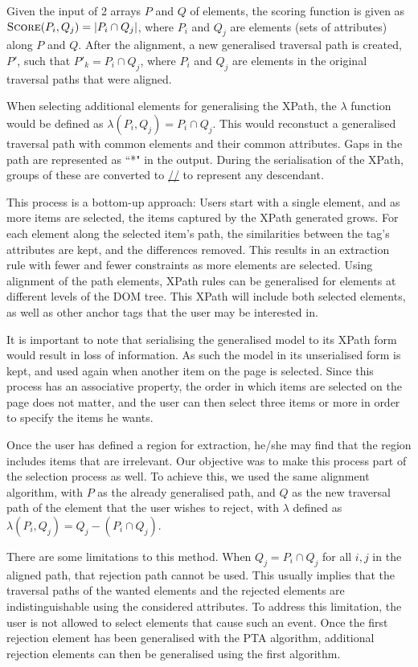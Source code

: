 Given the input of 2 arrays $P$ and $Q$ of elements, the scoring function is given as
$\textsc{Score}(P_i,Q_j) = |P_i \cap Q_j|$, where $P_i$ and $Q_j$ are elements (sets of
attributes) along $P$ and $Q$. After the alignment, a new generalised traversal path is
created, $P'$, such that $P'_k = P_i \cap Q_j$, where $P_i$ and $Q_j$ are elements in the
original traversal paths that were aligned.


When selecting additional elements for generalising the XPath, the $\lambda$ function would be
defined as $\lambda(P_i,Q_j) = P_i \cap Q_j$. This would reconstuct a generalised traversal
path with common elements and their common attributes. Gaps in the path are represented as ``*"
 in the output. During the serialisation of the XPath, groups of these are converted to
 \url{//} to represent any descendant.

This process is a bottom-up approach: Users start with a single element, and as more items are
selected, the items captured by the XPath generated grows. For each element along the selected
item's path, the similarities between the tag's attributes are kept, and the differences
removed. This results in an extraction rule with fewer and fewer constraints as more elements
are selected. Using alignment of the path elements, XPath rules can be generalised for elements at different
levels of the DOM tree. This XPath will include both
selected elements, as well as other anchor tags that the user may be interested in.


It is important to note that serialising the generalised model to its XPath form would result
in loss of information. As such the model in its unserialised form is kept, and used again when
another item on the page is selected. Since this process has an associative property, the order
in which items are selected on the page does not matter, and the user can then select three items
or more in order to specify the items he wants.

Once the user has defined a region for extraction, he/she may find that the region includes
items that are irrelevant. Our objective was to make this process part of the selection process as
well. To achieve this, we used the same alignment algorithm, with $P$ as the already
generalised path, and $Q$ as the new traversal path of the element that the user wishes to
reject, with $\lambda$ defined as $\lambda(P_i,Q_j) = Q_j - (P_i \cap Q_j)$.

There are some limitations to this method. When $Q_j = P_i \cap Q_j$ for all $i,j$
in the aligned path, that rejection path cannot be used. This usually implies that the
traversal paths of the wanted elements and the rejected elements are indistinguishable using
the considered attributes. To address this limitation, the user is not allowed to select elements that
cause such an event. Once the first rejection element has been generalised with the PTA
algorithm, additional rejection elements can then be generalised using the first algorithm.

